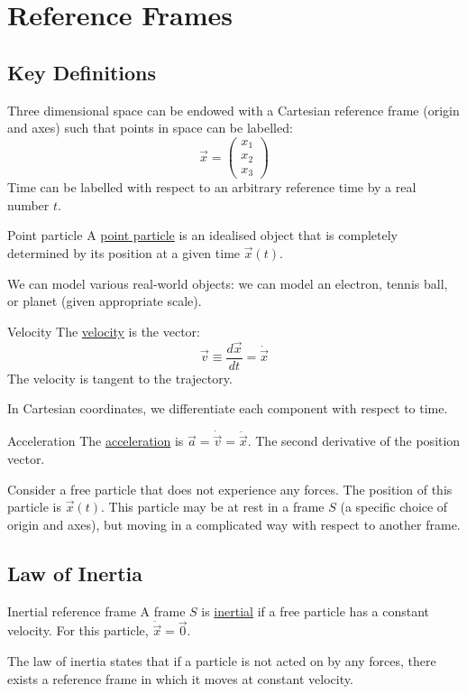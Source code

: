 \documentclass[../Main.tex]{subfiles}
\begin{document}
\section{Reference Frames}
\subsection{Key Definitions}
Three dimensional space can be endowed with a Cartesian reference frame (origin and axes) such that points in space can be labelled:
\begin{equation*}
    \vec{x} = \begin{pmatrix}x_1 \\ x_2 \\ x_3\end{pmatrix}
\end{equation*}
Time can be labelled with respect to an arbitrary reference time by a real number $t$.\par
\begin{definition}{Point particle}
    A \underline{point particle} is an idealised object that is completely determined by its position at a given time $\vec{x}(t)$.
\end{definition}
We can model various real-world objects: we can model an electron, tennis ball, or planet (given appropriate scale).
\begin{definition}{Velocity}
    The \underline{velocity} is the vector:
    \begin{equation*}
        \vec{v} \equiv \frac{d\vec{x}}{dt} = \dot{\vec{x}}
    \end{equation*}
    The velocity is tangent to the trajectory.
\end{definition}
In Cartesian coordinates, we differentiate each component with respect to time.
\begin{definition}{Acceleration}
    The \underline{acceleration} is $\vec{a} = \dot{\vec{v}} = \ddot{\vec{x}}$. The second derivative of the position vector.
\end{definition}
Consider a free particle that does not experience any forces. The position of this particle is $\vec{x}(t)$. This particle may be at rest in a frame $S$ (a specific choice of origin and axes), but moving in a complicated way with respect to another frame.
\subsection{Law of Inertia}
\begin{definition}{Inertial reference frame}
    A frame $S$ is \underline{inertial} if a free particle has a constant velocity. For this particle, $\ddot{\vec{x}} = \vec{0}$.
\end{definition}
The law of inertia states that if a particle is not acted on by any forces, there exists a reference frame in which it moves at constant velocity.
\end{document}
